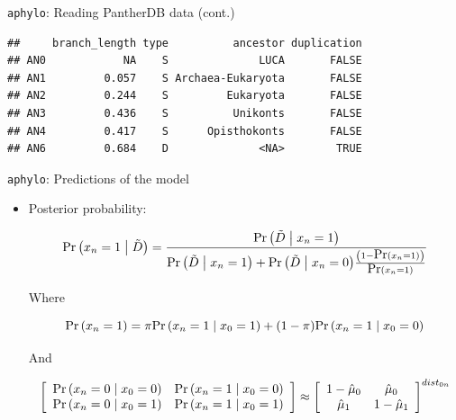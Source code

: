 \documentclass[9pt,ignorenonframetext,]{beamer}
\newenvironment{Shaded}{\begin{snugshade}}{\end{snugshade}}
\newcommand{\KeywordTok}[1]{\textcolor[rgb]{0.94,0.87,0.69}{#1}}
\newcommand{\CommentTok}[1]{\textcolor[rgb]{0.50,0.62,0.50}{#1}}
\newcommand{\OperatorTok}[1]{\textcolor[rgb]{0.94,0.94,0.82}{#1}}
\newcommand{\NormalTok}[1]{\textcolor[rgb]{0.80,0.80,0.80}{#1}}
\renewcommand{\Pr}[1]{{\mbox{Pr}\left(#1\right) }}
\newcommand{\Prcond}[2]{{\mbox{Pr}\left(#1\vphantom{#2}\;\right|\left.\vphantom{#1}#2\right)}}
\newcommand{\aphylo}{D{}}      %
\newcommand{\aphyloObs}{\tilde \aphylo{}} %
\newcommand{\ann}{x{}} %
\begin{document}
\begin{frame}[fragile]{\texttt{aphylo}: Reading PantherDB data (cont.)}

\footnotesize

\begin{Shaded}
\end{Shaded}

\begin{verbatim}
##     branch_length type          ancestor duplication
## AN0            NA    S              LUCA       FALSE
## AN1         0.057    S Archaea-Eukaryota       FALSE
## AN2         0.244    S         Eukaryota       FALSE
## AN3         0.436    S          Unikonts       FALSE
## AN4         0.417    S      Opisthokonts       FALSE
## AN6         0.684    D              <NA>        TRUE
\end{verbatim}

\normalsize

\footnotesize

\normalsize

\end{frame}

\begin{frame}[t]{\texttt{aphylo}: Predictions of the model}

\begin{itemize}
\item
  Posterior probability:

  \begin{equation}
  \label{eq:impute2}
  \Prcond{\ann_{n} = 1}{\aphyloObs} = 
  \frac{\Prcond{\aphyloObs}{\ann_{n} = 1}}{
  \Prcond{\aphyloObs}{\ann_{n} = 1} + \Prcond{\aphyloObs}{\ann_{n} = 0} \frac{\left(1 - \Pr{\ann_{n} = 1}\right)}{\Pr{\ann_{n} = 1}}
  }
  \end{equation}

  \pause

  Where

  \[
  \Pr{\ann_{n} = 1} = %
  \pi \Prcond{\ann_{n} = 1}{\ann_{0} = 1} + 
  (1 - \pi) \Prcond{\ann_{n} = 1}{\ann_{0} = 0}
  \]

  \pause And

  \[
  \left[\begin{array}{cc}
  \Prcond{\ann_n = 0}{\ann_0 = 0} & \Prcond{\ann_n = 1}{\ann_0 = 0} \\
  \Prcond{\ann_n = 0}{\ann_0 = 1} & \Prcond{\ann_n = 1}{\ann_0 = 1}
  \end{array}
  \right] \approx
  \left[\begin{array}{cc}
  1 - \hat\mu_0 &  \hat\mu_0 \\
  \hat\mu_1 &  1 - \hat\mu_1
  \end{array}
  \right]^{dist_{0n}}
  \]
\end{itemize}

\end{frame}
\end{document}
